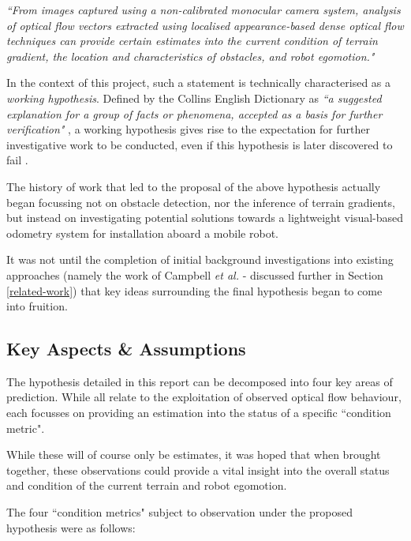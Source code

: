 \indent \textit{``From images captured using a non-calibrated monocular camera system, analysis of optical flow vectors extracted using localised appearance-based dense optical flow techniques can provide certain estimates into the current condition of terrain gradient, the location and characteristics of obstacles, and robot egomotion."}
 
In the context of this project, such a statement is technically characterised as a \textit{working hypothesis}. Defined by the Collins English Dictionary as \textit{``a suggested explanation for a group of facts or phenomena, accepted as a basis for further verification"} \cite{collins}, a working hypothesis gives rise to the expectation for further investigative work to be conducted, even if this hypothesis is later discovered to fail \cite{century}. 

The history of work that led to the proposal of the above hypothesis actually began focussing not on obstacle detection, nor the inference of terrain gradients, but instead on investigating potential solutions towards a lightweight visual-based odometry system for installation aboard a mobile robot. 

It was not until the completion of initial background investigations into existing approaches (namely the work of Campbell \textit{et al.} \cite{campbell} - discussed further in Section \ref{related-work}) that key ideas surrounding the final hypothesis began to come into fruition. 

\subsection{Key Aspects \& Assumptions}
\label{assumptions}

The hypothesis detailed in this report can be decomposed into four key areas of prediction. While all relate to the exploitation of observed optical flow behaviour, each focusses on providing an estimation into the status of a specific ``condition metric". 

While these will of course only be estimates, it was hoped that when brought together, these observations could provide a vital insight into the overall status and condition of the current terrain and robot egomotion. 

The four ``condition metrics" subject to observation under the proposed hypothesis were as follows:

